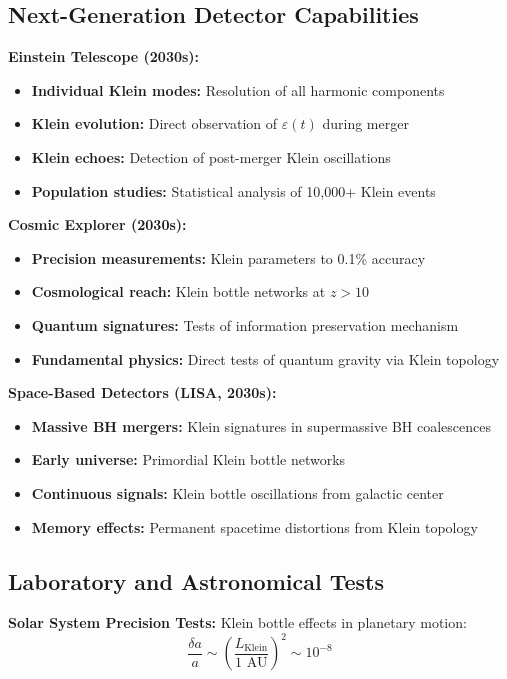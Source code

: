\documentclass[12pt,a4paper]{article}
\newcommand{\Klein}{\text{Klein}}
\begin{document}
\subsection{Next-Generation Detector Capabilities}

\textbf{Einstein Telescope (2030s):}
\begin{itemize}
    \item \textbf{Individual Klein modes:} Resolution of all harmonic components
    \item \textbf{Klein evolution:} Direct observation of $\varepsilon(t)$ during merger
    \item \textbf{Klein echoes:} Detection of post-merger Klein oscillations
    \item \textbf{Population studies:} Statistical analysis of 10,000+ Klein events
\end{itemize}

\textbf{Cosmic Explorer (2030s):}
\begin{itemize}
    \item \textbf{Precision measurements:} Klein parameters to 0.1\% accuracy
    \item \textbf{Cosmological reach:} Klein bottle networks at $z > 10$
    \item \textbf{Quantum signatures:} Tests of information preservation mechanism
    \item \textbf{Fundamental physics:} Direct tests of quantum gravity via Klein topology
\end{itemize}

\textbf{Space-Based Detectors (LISA, 2030s):}
\begin{itemize}
    \item \textbf{Massive BH mergers:} Klein signatures in supermassive BH coalescences
    \item \textbf{Early universe:} Primordial Klein bottle networks
    \item \textbf{Continuous signals:} Klein bottle oscillations from galactic center
    \item \textbf{Memory effects:} Permanent spacetime distortions from Klein topology
\end{itemize}

\subsection{Laboratory and Astronomical Tests}

\textbf{Solar System Precision Tests:}
Klein bottle effects in planetary motion:
\begin{equation}
\frac{\delta a}{a} \sim \left(\frac{L_{\Klein}}{1 \text{ AU}}\right)^2 \sim 10^{-8}
\end{equation}
\end{document}
